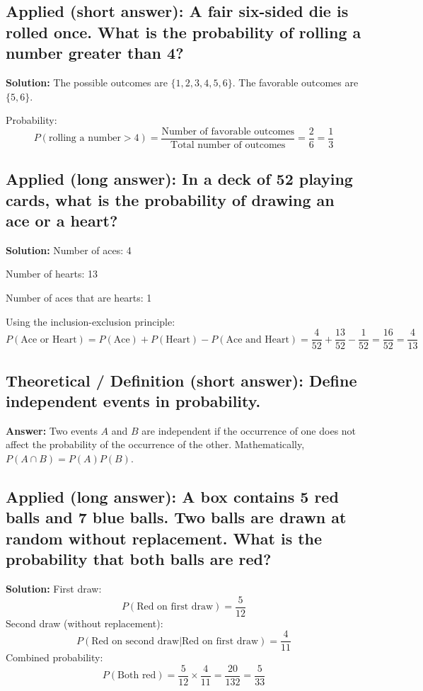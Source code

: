 \documentclass[12pt]{article}
\begin{document}
\subsection{Applied (short answer): A fair six-sided die is rolled once. What is the probability of rolling a number greater than 4?}

\textbf{Solution:}
The possible outcomes are \( \{1, 2, 3, 4, 5, 6\} \). The favorable outcomes are \( \{5, 6\} \).

Probability:
\[
P(\text{rolling a number} > 4) = \frac{\text{Number of favorable outcomes}}{\text{Total number of outcomes}} = \frac{2}{6} = \frac{1}{3}
\]

\subsection{Applied (long answer): In a deck of 52 playing cards, what is the probability of drawing an ace or a heart?}

\textbf{Solution:}
Number of aces: 4

Number of hearts: 13

Number of aces that are hearts: 1

Using the inclusion-exclusion principle:
\[
P(\text{Ace or Heart}) = P(\text{Ace}) + P(\text{Heart}) - P(\text{Ace and Heart}) = \frac{4}{52} + \frac{13}{52} - \frac{1}{52} = \frac{16}{52} = \frac{4}{13}
\]

\subsection{Theoretical / Definition (short answer): Define independent events in probability.}

\textbf{Answer:} Two events \( A \) and \( B \) are independent if the occurrence of one does not affect the probability of the occurrence of the other. Mathematically, \( P(A \cap B) = P(A) P(B) \).

\subsection{Applied (long answer): A box contains 5 red balls and 7 blue balls. Two balls are drawn at random without replacement. What is the probability that both balls are red?}

\textbf{Solution:}
First draw:
\[
P(\text{Red on first draw}) = \frac{5}{12}
\]
Second draw (without replacement):
\[
P(\text{Red on second draw} | \text{Red on first draw}) = \frac{4}{11}
\]
Combined probability:
\[
P(\text{Both red}) = \frac{5}{12} \times \frac{4}{11} = \frac{20}{132} = \frac{5}{33}
\]
\end{document}
